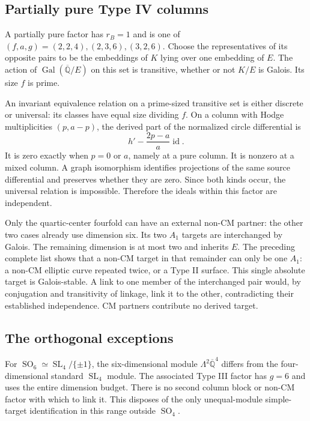 \documentclass[11pt]{article}
\newcommand{\kk}{{\overline{\mathbb Q}}}
\DeclareMathOperator{\Gal}{Gal}
\DeclareMathOperator{\SL}{SL}
\DeclareMathOperator{\SO}{SO}
\theoremstyle{remark}
\begin{document}
\subsection{Partially pure Type IV columns}

A partially pure factor has $r_B=1$ and is one of
$(f,a,g)=(2,2,4),(2,3,6),(3,2,6)$.
Choose the representatives of its opposite pairs to be the
embeddings of $K$ lying over one embedding of $E$.
The action of $\Gal(\kk/E)$ on this set is transitive, whether or
not $K/E$ is Galois. Its size $f$ is prime.

An invariant equivalence relation on a prime-sized transitive set
is either discrete or universal: its classes have equal size
dividing $f$. On a column with Hodge multiplicities $(p,a-p)$,
the derived part of the normalized circle differential is
\[
 h'-\frac{2p-a}{a}\operatorname{id}.
 \tag{10}
\]
It is zero exactly when $p=0$ or $a$, namely at a pure column.
It is nonzero at a mixed column. A graph isomorphism identifies
projections of the same source differential and preserves whether
they are zero. Since both kinds occur, the universal relation is
impossible. Therefore the ideals within this factor are independent.

Only the quartic-center fourfold can have an external non-CM
partner: the other two cases already use dimension six.
Its two $A_1$ targets are interchanged by Galois. The remaining
dimension is at most two and inherits $E$. The preceding complete
list shows that a non-CM target in that remainder can only be one
$A_1$: a non-CM elliptic curve repeated twice, or a Type II
surface. This single absolute target is Galois-stable.
A link to one member of the interchanged pair would, by conjugation
and transitivity of linkage, link it to the other, contradicting
their established independence. CM partners contribute no derived
target.

\subsection{The orthogonal exceptions}

For $\SO_6\simeq\SL_4/\{\pm1\}$, the six-dimensional module
$\Lambda^2\kk^4$ differs from the four-dimensional standard
$\SL_4$ module. The associated Type III factor has $g=6$ and
uses the entire dimension budget. There is no second column block
or non-CM factor with which to link it. This disposes of the only
unequal-module simple-target identification in this range outside
$\SO_4$.
\end{document}
